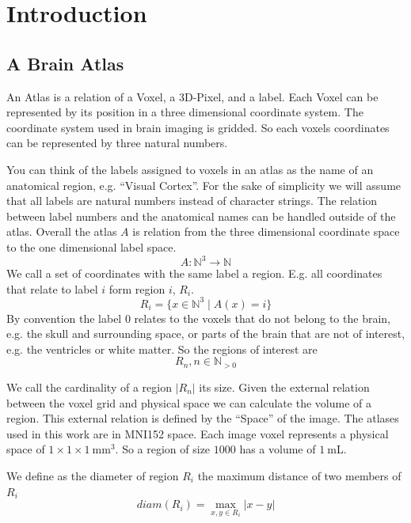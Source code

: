 \documentclass[12pt, a4paper]{article}
\begin{document}
\section{Introduction}
\subsection{A Brain Atlas}
An Atlas is a relation of a Voxel, a 3D-Pixel, and a label.
Each Voxel can be represented by its position in a three dimensional coordinate system. The coordinate system used in brain imaging is gridded. So each voxels coordinates can be represented by three natural numbers. 

You can think of the labels assigned to voxels in an atlas as the name of an anatomical region, e.g. ``Visual Cortex''.
For the sake of simplicity we will assume that all labels are natural numbers instead of character strings. The relation between label numbers and the anatomical names can be handled outside of the atlas. 
Overall the atlas $A$ is relation from the three dimensional coordinate space to the one dimensional label space.
\begin{equation}
 A \colon \mathbb{N}^{3}  \rightarrow \mathbb{N}
\end{equation}
We call a set of coordinates with the same label a region.
E.g. all coordinates that relate to label $i$ form region $i$, $R_i$.
\begin{equation}
 R_i = \{ x \in \mathbb{N}^3 \mid A\left(x\right) = i \}
\end{equation}
By convention the label $0$ relates to the voxels that do not belong to the brain, e.g. the skull and surrounding space, or parts of the brain that are not of interest, e.g. the ventricles or white matter.
So the regions of interest are
\begin{equation}
 R_n, n \in \mathbb{N}_{>0}
\end{equation}

We call the cardinality of a region $|R_n|$ its size.
Given the external relation between the voxel grid and physical space we can calculate the volume of a region. 
This external relation is defined by the ``Space'' of the image.
The atlases used in this work are in MNI152 space. Each image voxel represents a physical space of $1\times1\times1 ~\text{mm}^3$.
So a region of size $1000$ has a volume of $1~$mL.

We define as the diameter of region $R_i$ the maximum distance of two members of $R_i$
\begin{equation}
 diam(R_i) = \max_{x,y \in R_i} |x-y|
\end{equation}
\end{document}
